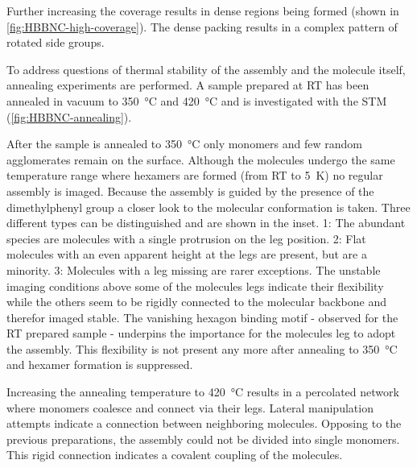 Further increasing the coverage results in dense regions being formed (shown in \autoref{fig:HBBNC-high-coverage}). The dense packing results in a complex pattern of rotated side groups.

To address questions of thermal stability of the assembly and the molecule itself, annealing experiments are performed. A sample prepared at RT has been annealed in vacuum to \SI{350}{\celsius} and \SI{420}{\celsius} and is investigated with the STM (\autoref{fig:HBBNC-annealing}).

After the sample is annealed to \SI{350}{\celsius} only monomers and few random agglomerates remain on the surface. Although the molecules undergo the same temperature range where hexamers are formed (from RT to \SI{5}{\kelvin}) no regular assembly is imaged. Because the assembly is guided by the presence of the dimethylphenyl group a closer look to the molecular conformation is taken. Three different types can be distinguished and are shown in the inset. 
1: The abundant species are molecules with a single protrusion on the leg position.
2: Flat molecules with an even apparent height at the legs are present, but are a minority.
3: Molecules with a leg missing are rarer exceptions.
The unstable imaging conditions above some of the molecules legs indicate their flexibility while the others seem to be rigidly connected to the molecular backbone and therefor imaged stable. The vanishing hexagon binding motif - observed for the RT prepared sample - underpins the importance for the molecules leg to adopt the assembly. This flexibility is not present any more after annealing to \SI{350}{\celsius} and hexamer formation is suppressed.

Increasing the annealing temperature to \SI{420}{\celsius} results in a percolated network where monomers  coalesce and connect via their legs. Lateral manipulation attempts indicate a connection between neighboring molecules. Opposing to the previous preparations, the assembly could not be divided into single monomers. This rigid connection indicates a covalent coupling of the molecules. 

